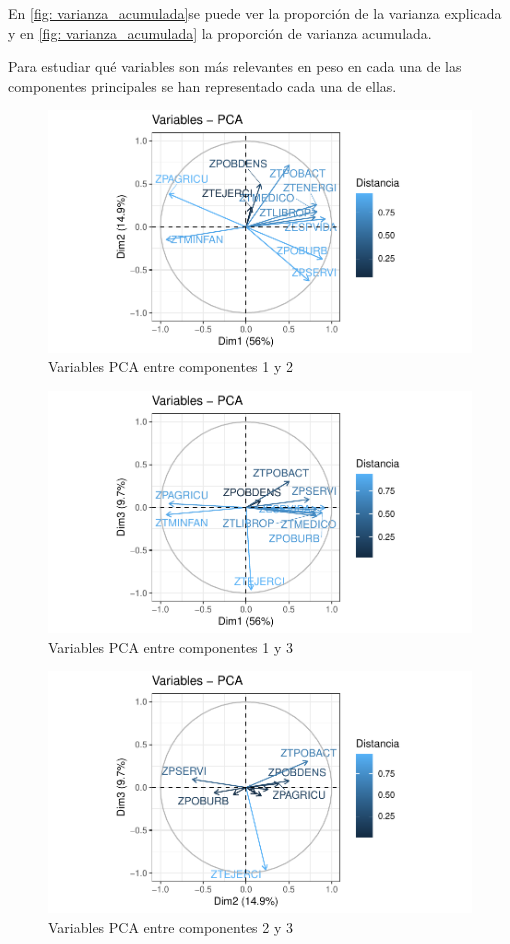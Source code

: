 \documentclass[twoside,openright,titlepage,numbers=noenddot,openany,headinclude,footinclude=true,
cleardoublepage=empty,abstractoff,BCOR=5mm,paper=a4,fontsize=12pt,main=spanish]{scrreprt}
\begin{document}
En \eqref{fig: varianza_acumulada}se puede ver la proporción de la varianza explicada y en \eqref{fig: varianza_acumulada} la proporción de varianza acumulada.

Para estudiar qué variables son más relevantes en peso en cada una de las componentes principales se han representado cada una de ellas.

\begin{figure}[H]
\includegraphics[scale=1]{pca_12.pdf}
\caption{Variables PCA entre componentes 1 y 2}
\label{fig: pca_12}
\end{figure}

\begin{figure}[H]
\includegraphics[scale=1]{pca_13.pdf}
\caption{Variables PCA entre componentes 1 y 3}
\label{fig: pca_13}
\end{figure}

\begin{figure}[H]
\includegraphics[scale=1]{pca_23.pdf}
\caption{Variables PCA entre componentes 2 y 3}
\label{fig: pca_23}
\end{figure}
\end{document}
